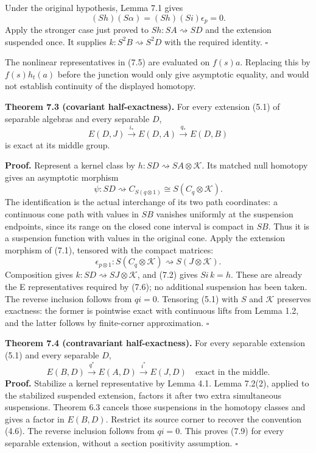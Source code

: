 \documentclass[
  11pt,
]{article}
\begin{document}
Under the original hypothesis, Lemma 7.1 gives \[
(Sh)(S\alpha)=(Sh)(Si)\epsilon_p=0.
\] Apply the stronger case just proved to \(Sh:SA \rightsquigarrow SD\)
and the extension suspended once. It supplies
\(k:S^2B \rightsquigarrow S^2D\) with the required identity. \(\square\)

The nonlinear representatives in (7.5) are evaluated on \(f(s)a\).
Replacing this by \(f(s)h_t(a)\) before the junction would only give
asymptotic equality, and would not establish continuity of the displayed
homotopy.

\textbf{Theorem 7.3 (covariant half-exactness).} For every extension
(5.1) of separable algebras and every separable \(D\), \[
E(D,J)\xrightarrow{i_*}E(D,A)\xrightarrow{q_*}E(D,B)
\tag{7.6}
\] is exact at its middle group.

\textbf{Proof.} Represent a kernel class by
\(h:SD \rightsquigarrow SA\otimes\mathcal K\). Its matched null homotopy
gives an asymptotic morphism \[
\psi:SD \rightsquigarrow C_{S(q\otimes1)}
\cong S(C_q\otimes\mathcal K).
\tag{7.7}
\] The identification is the actual interchange of its two path
coordinates: a continuous cone path with values in \(SB\) vanishes
uniformly at the suspension endpoints, since its range on the closed
cone interval is compact in \(SB\). Thus it is a suspension function
with values in the original cone. Apply the extension morphism of (7.1),
tensored with the compact matrices: \[
\epsilon_{p\otimes1}:S(C_q\otimes\mathcal K)
\rightsquigarrow S(J\otimes\mathcal K).
\tag{7.8}
\] Composition gives \(k:SD \rightsquigarrow SJ\otimes\mathcal K\), and
(7.2) gives \(Si\,k=h\). These are already the E representatives
required by (7.6); no additional suspension has been taken. The reverse
inclusion follows from \(qi=0\). Tensoring (5.1) with \(S\) and
\(\mathcal K\) preserves exactness: the former is pointwise exact with
continuous lifts from Lemma 1.2, and the latter follows by finite-corner
approximation. \(\square\)

\textbf{Theorem 7.4 (contravariant half-exactness).} For every separable
extension (5.1) and every separable \(D\), \[
E(B,D)\xrightarrow{q^*}E(A,D)\xrightarrow{i^*}E(J,D)
\quad\text{exact in the middle}.
\tag{7.9}
\] \textbf{Proof.} Stabilize a kernel representative by Lemma 4.1. Lemma
7.2(2), applied to the stabilized suspended extension, factors it after
two extra simultaneous suspensions. Theorem 6.3 cancels those
suspensions in the homotopy classes and gives a factor in \(E(B,D)\).
Restrict its source corner to recover the convention (4.6). The reverse
inclusion follows from \(qi=0\). This proves (7.9) for every separable
extension, without a section positivity assumption. \(\square\)
\end{document}
